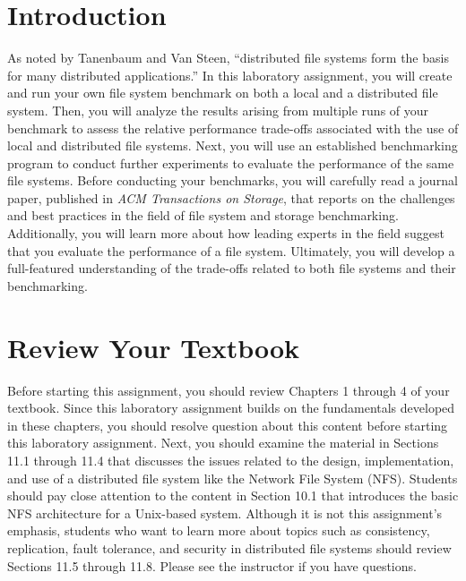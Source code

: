 

\usepackage[compact]{titlesec}
\usepackage{hologo}



\section*{Introduction}

As noted by Tanenbaum and Van Steen, ``distributed file systems form the basis for many distributed applications.'' In
this laboratory assignment, you will create and run your own file system benchmark on both a local and a distributed
file system. Then, you will analyze the results arising from multiple runs of your benchmark to assess the relative
performance trade-offs associated with the use of local and distributed file systems. Next, you will use an established
benchmarking program to conduct further experiments to evaluate the performance of the same file systems. Before
conducting your benchmarks, you will carefully read a journal paper, published in {\em ACM Transactions on Storage},
that reports on the challenges and best practices in the field of file system and storage benchmarking. Additionally,
you will learn more about how leading experts in the field suggest that you evaluate the performance of a file system.
Ultimately, you will develop a full-featured understanding of the trade-offs related to both file systems and their
benchmarking.

\section*{Review Your Textbook}

Before starting this assignment, you should review Chapters 1 through 4 of your textbook. Since this laboratory
assignment builds on the fundamentals developed in these chapters, you should resolve question about this content before
starting this laboratory assignment. Next, you should examine the material in Sections 11.1 through 11.4 that discusses
the issues related to the design, implementation, and use of a distributed file system like the Network File System
(NFS). Students should pay close attention to the content in Section 10.1 that introduces the basic NFS architecture for
a Unix-based system. Although it is not this assignment's emphasis, students who want to learn more about topics such as
consistency, replication, fault tolerance, and security in distributed file systems should review Sections 11.5 through
11.8.  Please see the instructor if you have questions.

